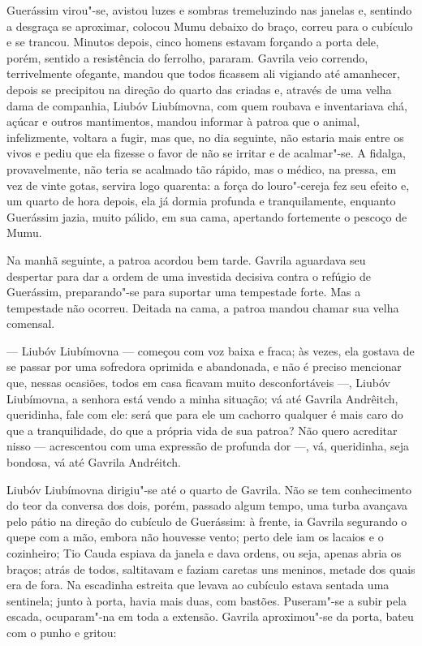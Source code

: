 Guerássim virou"-se, avistou luzes e sombras tremeluzindo nas janelas e,
sentindo a desgraça se aproximar, colocou Mumu debaixo do braço, correu
para o cubículo e se trancou. Minutos depois, cinco homens estavam
forçando a porta dele, porém, sentido a resistência do ferrolho,
pararam. Gavrila veio correndo, terrivelmente ofegante, mandou que todos
ficassem ali vigiando até amanhecer, depois se precipitou na direção do
quarto das criadas e, através de uma velha dama de companhia, Liubóv
Liubímovna, com quem roubava e inventariava chá, açúcar e outros
mantimentos, mandou informar à patroa que o animal, infelizmente,
voltara a fugir, mas que, no dia seguinte, não estaria mais entre os
vivos e pediu que ela fizesse o favor de não se irritar e de acalmar"-se.
A fidalga, provavelmente, não teria se acalmado tão rápido, mas o
médico, na pressa, em vez de vinte gotas, servira logo quarenta: a força
do louro"-cereja fez seu efeito e, um quarto de hora depois, ela já
dormia profunda e tranquilamente, enquanto Guerássim jazia, muito
pálido, em sua cama, apertando fortemente o pescoço de Mumu.

Na manhã seguinte, a patroa acordou bem tarde. Gavrila aguardava seu
despertar para dar a ordem de uma investida decisiva contra o refúgio de
Guerássim, preparando"-se para suportar uma tempestade forte. Mas a
tempestade não ocorreu. Deitada na cama, a patroa mandou chamar sua
velha comensal.

--- Liubóv Liubímovna --- começou com voz baixa e fraca; às vezes, ela
gostava de se passar por uma sofredora oprimida e abandonada, e não é
preciso mencionar que, nessas ocasiões, todos em casa ficavam muito
desconfortáveis ---, Liubóv Liubímovna, a senhora está vendo a minha
situação; vá até Gavrila Andrêitch, queridinha, fale com ele: será que
para ele um cachorro qualquer é mais caro do que a tranquilidade, do que
a própria vida de sua patroa? Não quero acreditar nisso --- acrescentou
com uma expressão de profunda dor ---, vá, queridinha, seja bondosa, vá
até Gavrila Andréitch.

Liubóv Liubímovna dirigiu"-se até o quarto de Gavrila. Não se tem
conhecimento do teor da conversa dos dois, porém, passado algum tempo,
uma turba avançava pelo pátio na direção do cubículo de Guerássim: à
frente, ia Gavrila segurando o quepe com a mão, embora não houvesse
vento; perto dele iam os lacaios e o cozinheiro; Tio Cauda espiava da
janela e dava ordens, ou seja, apenas abria os braços; atrás de todos,
saltitavam e faziam caretas uns meninos, metade dos quais era de fora.
Na escadinha estreita que levava ao cubículo estava sentada uma
sentinela; junto à porta, havia mais duas, com bastões. Puseram"-se a
subir pela escada, ocuparam"-na em toda a extensão. Gavrila aproximou"-se
da porta, bateu com o punho e gritou:

